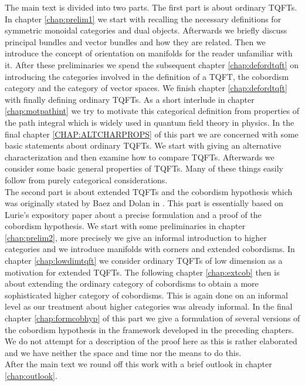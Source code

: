 The main text is divided into two parts. The first part is about ordinary TQFTs. In chapter \ref{chap:prelim1} we start with recalling the necessary definitions for symmetric monoidal categories and dual objects. Afterwards we briefly discuss principal bundles and vector bundles and how they are related. Then we introduce the concept of orientation on manifolds for the reader unfamiliar with it. After these preliminaries we spend the subsequent chapter \ref{chap:defordtqft} on introducing the categories involved in the definition of a TQFT, the cobordism category and the category of vector spaces. We finish chapter \ref{chap:defordtqft} with finally defining ordinary TQFTs. As a short interlude in chapter \ref{chap:motpathint} we try to motivate this categorical definition from properties of the path integral which is widely used in quantum field theory in physics. In the final chapter \ref{CHAP:ALTCHARPROPS} of this part we are concerned with some basic statements about ordinary TQFTs. We start with giving an alternative characterization and then examine how to compare TQFTs. Afterwards we consider some basic general properties of TQFTs. Many of these things easily follow from purely categorical considerations.
\\
The second part is about extended TQFTs and the cobordism hypothesis which was originally stated by Baez and Dolan in \cite{cc6d78b5}. This part is essentially based on Lurie's expository paper \cite{dfcdc48c} about a precise formulation and a proof of the cobordism hypothesis. We start with some preliminaries in chapter \ref{chap:prelim2}, more precisely we give an informal introduction to higher categories and we introduce manifolds with corners and extended cobordisms. In chapter \ref{chap:lowdimtqft} we consider ordinary TQFTs of low dimension as a motivation for extended TQFTs. The following chapter \ref{chap:extcob} then is about extending the ordinary category of cobordisms to obtain a more sophisticated higher category of cobordisms. This is again done on an informal level as our treatment about higher categories was already informal. In the final chapter \ref{chap:formcobhyp} of this part we give a formulation of several versions of the cobordism hypothesis in the framework developed in the preceding chapters. We do not attempt for a description of the proof here as this is rather elaborated and we have neither the space and time nor the means to do this.
\\
After the main text we round off this work with a brief outlook in chapter \ref{chap:outlook}.
\\
